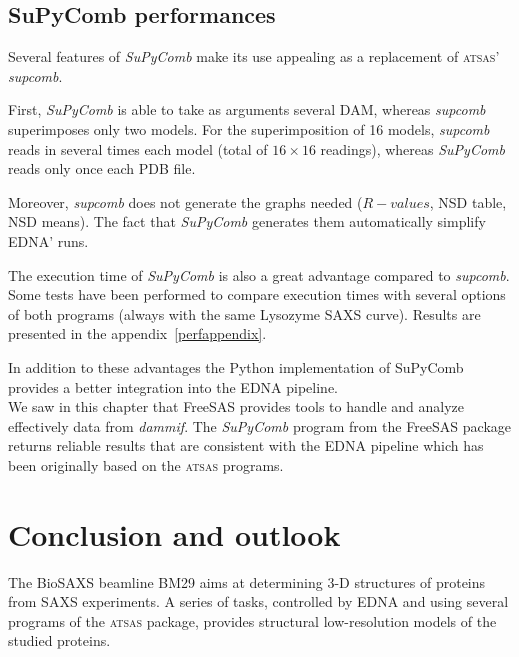 \documentclass[a4paper, 11pt]{report}
\begin{document}
\section{SuPyComb performances}

Several features of \textit{SuPyComb} make its use appealing as a 
replacement of \textsc{atsas}' \textit{supcomb}.

First, \textit{SuPyComb} is able to take as arguments several DAM, 
whereas \textit{supcomb} superimposes only two models. 
For the superimposition of 16 models, \textit{supcomb} reads in 
several times each model (total of $16 \times 16$ readings), whereas 
\textit{SuPyComb} reads only once each PDB file.

Moreover, \textit{supcomb} does not generate the graphs needed 
($R-values$, NSD table, NSD means). 
The fact that \textit{SuPyComb} generates them automatically simplify 
EDNA' runs.

The execution time of \textit{SuPyComb} is also a great advantage 
compared to \textit{supcomb}. 
Some tests have been performed to compare execution times with several 
options of both programs (always with the same Lysozyme SAXS curve). 
Results are presented in the appendix~\ref{perfappendix}.

In addition to these advantages the Python implementation of SuPyComb 
provides a better integration into the EDNA pipeline.\\

We saw in this chapter that FreeSAS provides tools to handle and 
analyze effectively data from \textit{dammif}. 
The \textit{SuPyComb} program from the FreeSAS package returns 
reliable results that are consistent with the EDNA pipeline which has 
been originally based on the \textsc{atsas} programs.


\chapter*{Conclusion and outlook}

The BioSAXS beamline BM29 aims at determining 3-D structures of 
proteins from SAXS experiments. 
A series of tasks, controlled by EDNA and using several programs of 
the \textsc{atsas} package, provides structural low-resolution models 
of the studied proteins.\\
\end{document}
